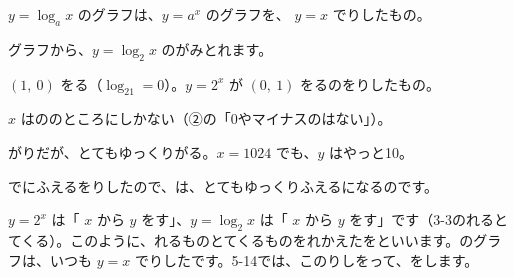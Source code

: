 \par\vspace{4pt}
\begin{taisetsu}
$y=\log_ax$ のグラフは、$y=a^x$ のグラフを、 $y=x$ でりしたもの。
\end{taisetsu}

グラフから、$y=\log_2x$ のがみとれます。
\begin{enumerate}[label={\bkcircled[bkTheme]{\arabic*}}, leftmargin=2.4\zw, itemsep=1pt, topsep=2pt]
\item {} $(1,\ 0)$ をる（$\log_21=0$）。$y=2^x$ が $(0,\ 1)$ をるのをりしたもの。
\item $x$ はののところにしかない（②の「0やマイナスのはない」）。
\item {}がりだが、とてもゆっくりがる。$x=1024$ でも、$y$ はやっと10。
\end{enumerate}
でにふえるをりしたので、は、とてもゆっくりふえるになるのです。

\begin{motto}[3]
\par\addvspace{3pt}\textbf{}\par\noindent
$y=2^x$ は「 $x$ から $y$ をす」、$y=\log_2x$ は「 $x$ から $y$ をす」です（3-3のれるとてくる）。このように、れるものとてくるものをれかえたを\textbf{}といいます。のグラフは、いつも $y=x$ でりしたです。5-14では、このりしをって、をします。
\end{motto}


